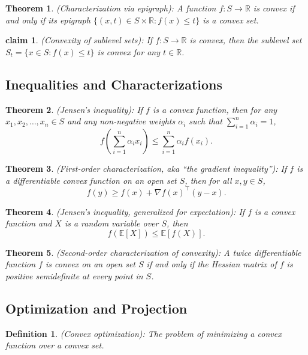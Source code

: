 \documentclass[11pt]{book} %
\newtheorem{theorem}{Theorem}[section]
\newtheorem{definition}{Definition}[section]
\newtheorem{claim}{claim}[section]
\begin{document}
\begin{theorem} (Characterization via epigraph): A function $f : S \to \mathbb{R}$ is convex if and only if its epigraph $\{(x,t) \in S \times \mathbb{R} : f(x) \leq t\}$ is a convex set.
\end{theorem}


\begin{claim} (Convexity of sublevel sets): If $f : S \to \mathbb{R}$ is convex, then the sublevel set $S_t = \{ x \in S : f(x) \leq t\}$ is convex for any $t \in \mathbb{R}$.
\end{claim}

\subsection{Inequalities and Characterizations}

\begin{theorem}(Jensen's inequality): If $f$ is a convex function, then for any $x_1, x_2, \ldots, x_n \in S$ and any non-negative weights $\alpha_i$ such that $\sum_{i=1}^n \alpha_i = 1$,
\[ f\left(\sum_{i=1}^n \alpha_i x_i\right) \leq \sum_{i=1}^n \alpha_i f(x_i). \]
\end{theorem}


\begin{theorem}(First-order characterization, aka “the gradient inequality”): If $f$ is a differentiable convex function on an open set $S$, then for all $x, y \in S$,
\[ f(y) \geq f(x) + \nabla f(x)^\top (y - x). \]
\end{theorem}


\begin{theorem} (Jensen’s inequality, generalized for expectation): If $f$ is a convex function and $X$ is a random variable over $S$, then
\[ f(\mathbb{E}[X]) \leq \mathbb{E}[f(X)]. \]
\end{theorem}


\begin{theorem} (Second-order characterization of convexity): A twice differentiable function $f$ is convex on an open set $S$ if and only if the Hessian matrix of $f$ is positive semidefinite at every point in $S$.
\end{theorem}

\subsection{Optimization and Projection}

\begin{definition} (Convex optimization): The problem of minimizing a convex function over a convex set.
\end{definition}
\end{document}
